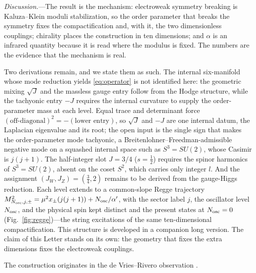 \documentclass[aps,prl,reprint,superscriptaddress,nofootinbib]{revtex4-2}
\begin{document}
\textit{Discussion.}---The result is the mechanism: electroweak symmetry breaking
is Kaluza--Klein moduli stabilization, so the order parameter that breaks the
symmetry fixes the compactification and, with it, the two dimensionless
couplings; chirality places the construction in ten dimensions; and $\alpha$ is
an infrared quantity because it is read where the modulus is fixed. The numbers
are the evidence that the mechanism is real.

Two derivations remain, and we state them as such. The internal six-manifold
whose mode reduction yields \eqref{eq:operator} is not identified here: the
geometric mixing $\sqrt J$ and the massless gauge entry follow from the Hodge
structure, while the tachyonic entry $-J$ requires the internal curvature to
supply the order-parameter mass at each level. Equal trace and determinant force
$(\text{off-diagonal})^2=-(\text{lower entry})$, so $\sqrt J$ and $-J$ are one
internal datum, the Laplacian eigenvalue and its root; the open input is the
single sign that makes the order-parameter mode tachyonic, a
Breitenlohner--Freedman-admissible negative mode on a squashed internal space
such as $S^3=SU(2)$, whose Casimir is $j(j+1)$. The half-integer slot
$J=3/4$ ($s=\tfrac12$) requires the spinor harmonics of $S^3=SU(2)$, absent on
the coset $S^2$, which carries only integer $l$. And the assignment
$(J_W,J_Z)=(\tfrac34,2)$ remains to be derived from the gauge-Higgs reduction.
Each level extends to a common-slope Regge trajectory
$M^2_{N_{\rm osc},j,\pm}=\mu^2x_\pm(j(j+1))+N_{\rm osc}/\alpha'$, with the sector
label $j$, the oscillator level $N_{\rm osc}$, and the physical spin kept
distinct and the present states at $N_{\rm osc}=0$ (Fig.~\ref{fig:regge})---the
string excitations of the same ten-dimensional compactification. This structure is developed in a
companion long version. The claim of this Letter stands on its own: the geometry that fixes the
extra dimensions fixes the electroweak couplings.

\begin{acknowledgments}
The construction originates in the de Vries--Rivero observation \cite{Rivero2006}.
\end{acknowledgments}


\end{document}
